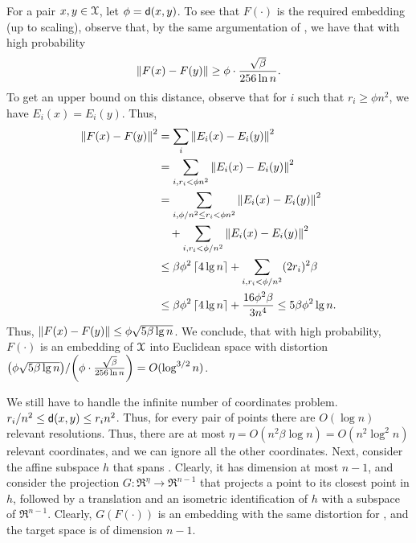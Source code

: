 For a pair $x,y \in \FMS$, let $\phi =\mathsf{d}(x,y)$.  To see that
$F(\cdot)$ is the required embedding (up to scaling), observe that, by
the same argumentation of , we have that
with high probability 
\begin{equation*}
    \left\| {F(x)- F(y)} \right\| \geq \phi \cdot \frac{\sqrt{\beta}}{256 \ln n}.
\end{equation*}
To get an upper bound on this distance, observe that for $i$ such that
$r_i \geq \phi n^2$, we have $E_i(x) = E_i(y)$. Thus,
\begin{align*}
  \dist{F(x) - F(y)}^2%
  &=%
    \sum_i \dist{E_i(x) - E_i(y)}^2
    \\&= \sum_{i, r_i <
    \phi n^2} \dist{E_i(x) - E_i(y)}^2\\
  &=%
    \sum_{i, \phi/n^2 \leq r_i < \phi
    n^2 } \dist{E_i(x) - E_i(y)}^2
    \\&\quad + \sum_{i, r_i < \phi/ n^2 }
    \dist{E_i(x) - E_i(y)}^2 \\
  &\leq%
    \beta \phi^2 \ceil{4\lg n} +
    \sum_{i, r_i < \phi/n^2} (2r_i)^2 \beta
    \\&
    \leq \beta\phi^2\ceil{4\lg n}+\frac{16\phi^2\beta}{3n^4}
    \leq 5\beta \phi^2 \lg n.
\end{align*}
Thus, $\left\| {F(x) - F(y)} \right\| \leq \phi \sqrt{5 \beta \lg n}$. We conclude,
that with high probability, $F(\cdot)$ is an embedding of $\FMS$ into
Euclidean space with distortion $\nfrac{\pth{\phi \sqrt{5 \beta \lg
         n}}}{\pth{\phi \cdot \frac{\sqrt{\beta}}{256 \ln n}}} = O(
\log^{3/2} n)$. 

We still have to handle the infinite number of coordinates problem.
$r_i/n^2\leq\mathsf{d}(x,y)\leq r_i n^2$.
 Thus, for every pair of points there are $O( \log n)$
relevant resolutions. Thus, there are at most $\eta = O(n^2 \beta \log
n) = O(n^2 \log^2 n)$ relevant coordinates, and we can ignore all the
other coordinates. Next, consider the affine subspace $h$ that spans
. Clearly, it has dimension at most $n-1$, and consider the projection
$G:\Re^\eta \rightarrow \Re^{n-1}$ that projects a point to its
closest point in $h$, followed by a translation and an isometric
identification of $h$ with a subspace of $\Re^{n-1}$. Clearly, $G(F(\cdot))$ is an embedding with the
same distortion for , and the target space is of dimension
$n-1$. 

